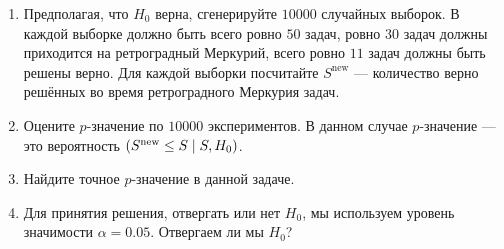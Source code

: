 \documentclass[12pt]{article}
\let\P\relax
\DeclareMathOperator{\P}{\mathbb{P}}
\begin{document}
\begin{enumerate}
\begin{enumerate}
    \item Предполагая, что $H_0$ верна, сгенерируйте $10000$ случайных выборок. 
    В каждой выборке должно быть всего ровно $50$ задач, ровно $30$ задач должны приходится на ретроградный Меркурий,
    всего ровно $11$ задач должны быть решены верно. 
    Для каждой выборки посчитайте $S^{\text{new}}$ — количество верно решённых во время ретроградного Меркурия задач.
    \item Оцените $p$-значение по $10000$ экспериментов. 
    В данном случае $p$-значение — это вероятность $\P(S^{\text{new}} \leq S \mid S, H_0)$.
    \item Найдите точное $p$-значение в данной задаче. 
    \item Для принятия решения, отвергать или нет $H_0$, мы используем уровень значимости $\alpha = 0.05$.
    Отвергаем ли мы $H_0$?
\end{enumerate}

\end{enumerate}
\end{document}
